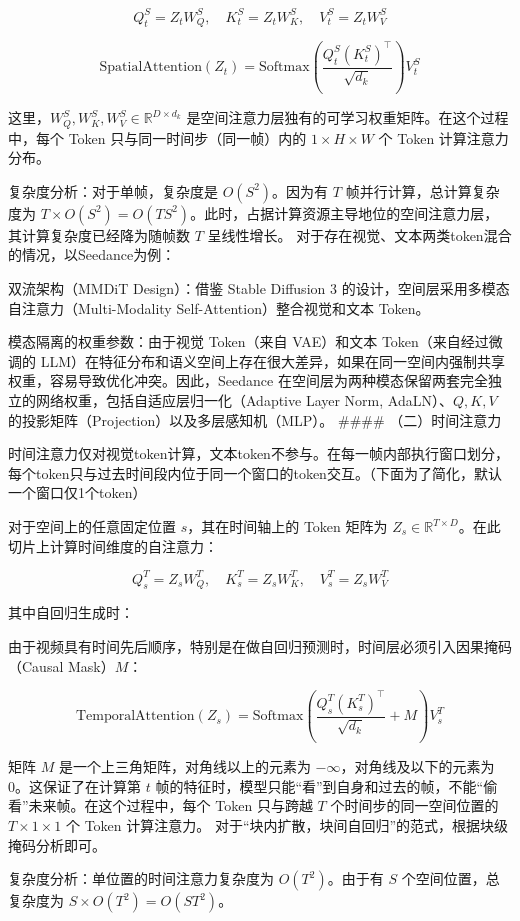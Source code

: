\[
Q_t^S=Z_tW_Q^S,\quad K_t^S=Z_tW_K^S,\quad V_t^S=Z_tW_V^S
\]

\[
\mathrm{SpatialAttention}(Z_t)=\mathrm{Softmax}\left(\frac{Q_t^S(K_t^S)^\top}{\sqrt{d_k}}\right)V_t^S
\]

这里，\(W_Q^S,W_K^S,W_V^S\in\mathbb{R}^{D\times d_k}\) 是空间注意力层独有的可学习权重矩阵。在这个过程中，每个 Token 只与同一时间步（同一帧）内的 \(1\times H\times W\) 个 Token 计算注意力分布。

复杂度分析：对于单帧，复杂度是 \(O(S^2)\)。因为有 \(T\) 帧并行计算，总计算复杂度为 \(T\times O(S^2)=O(TS^2)\)。此时，占据计算资源主导地位的空间注意力层，其计算复杂度已经降为随帧数 \(T\) 呈线性增长。
对于存在视觉、文本两类token混合的情况，以Seedance为例：

双流架构（MMDiT Design）：借鉴 Stable Diffusion 3 的设计，空间层采用多模态自注意力（Multi-Modality Self-Attention）整合视觉和文本 Token。

模态隔离的权重参数：由于视觉 Token（来自 VAE）和文本 Token（来自经过微调的 LLM）在特征分布和语义空间上存在很大差异，如果在同一空间内强制共享权重，容易导致优化冲突。因此，Seedance 在空间层为两种模态保留两套完全独立的网络权重，包括自适应层归一化（Adaptive Layer Norm, AdaLN）、\(Q,K,V\) 的投影矩阵（Projection）以及多层感知机（MLP）。
\#\#\#\# （二）时间注意力

时间注意力仅对视觉token计算，文本token不参与。在每一帧内部执行窗口划分，每个token只与过去时间段内位于同一个窗口的token交互。（下面为了简化，默认一个窗口仅1个token）

对于空间上的任意固定位置 \(s\)，其在时间轴上的 Token 矩阵为 \(Z_s\in\mathbb{R}^{T\times D}\)。在此切片上计算时间维度的自注意力：

\[
Q_s^T=Z_sW_Q^T,\quad K_s^T=Z_sW_K^T,\quad V_s^T=Z_sW_V^T
\]

其中自回归生成时：

由于视频具有时间先后顺序，特别是在做自回归预测时，时间层必须引入因果掩码（Causal Mask）\(M\)：

\[
\mathrm{TemporalAttention}(Z_s)=\mathrm{Softmax}\left(\frac{Q_s^T(K_s^T)^\top}{\sqrt{d_k}}+M\right)V_s^T
\]

矩阵 \(M\) 是一个上三角矩阵，对角线以上的元素为 \(-\infty\)，对角线及以下的元素为 0。这保证了在计算第 \(t\) 帧的特征时，模型只能``看''到自身和过去的帧，不能``偷看''未来帧。在这个过程中，每个 Token 只与跨越 \(T\) 个时间步的同一空间位置的 \(T\times 1\times 1\) 个 Token 计算注意力。
对于``块内扩散，块间自回归''的范式，根据块级掩码分析即可。

复杂度分析：单位置的时间注意力复杂度为 \(O(T^2)\)。由于有 \(S\) 个空间位置，总复杂度为 \(S\times O(T^2)=O(ST^2)\)。

